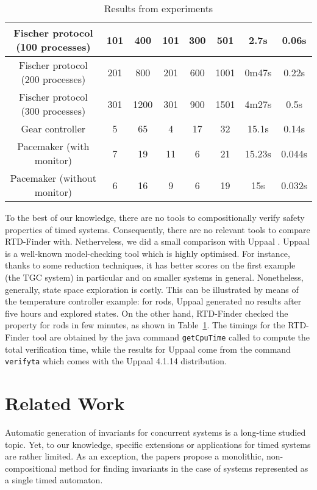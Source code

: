 \documentclass{LMCS}
\theoremstyle{plain}\newtheorem{remark}[thm]{Remark}
\theoremstyle{plain}\newtheorem{example}[thm]{Example}
\begin{document}
\begin{enumerate}
\begin{table}[htp]
{\begin{tabular}{|c|c|c|c|c|c|c|c|}
\hline \hline 
Fischer protocol (100 processes) & 101 & 400 & 101  & 300 & 501 & 2.7s & 0.06s \tabularnewline
\hline 
Fischer protocol (200 processes) & 201 & 800 & 201  & 600 & 1001 & 0m47s & 0.22s\tabularnewline
\hline 
Fischer protocol (300 processes) & 301 & 1200 &  301 & 900 & 1501 & 4m27s & 0.5s \tabularnewline
\hline \hline
Gear controller & 5 & 65 & 4 & 17 & 32 & 15.1s & 0.14s \tabularnewline
\hline \hline 
Pacemaker (with monitor) & 7 & 19 &  11 & 6 & 21 & 15.23s & 0.044s\tabularnewline
\hline 
Pacemaker (without monitor) & 6 & 16 &  9 & 6 & 19 & 15s & 0.032s\tabularnewline
\hline 
\end{tabular}
\caption{ Results from experiments} \label{tab:res}
}
\end{table}

To the best of our knowledge, there are no tools to compositionally
verify safety properties of timed systems. Consequently, there are no
relevant tools to compare RTD-Finder with. Netherveless, we did a
small comparison with Uppaal \cite{uppaal}. Uppaal is a well-known model-checking
tool which is highly optimised. For instance, thanks to some reduction
techniques, it has better scores on the first example (the TGC system)
in particular and on smaller systems in general.  Nonetheless,
generally, state space exploration is costly. This can be
illustrated by means of the temperature controller example: for
 rods, Uppaal generated no results after five hours and 
explored states. On the other hand, RTD-Finder checked the property for
 rods in few minutes, as shown in Table~\ref{tab:res}.  The
timings for the RTD-Finder tool are obtained by the java command
\texttt{getCpuTime} called to compute the total verification time,
while the results for Uppaal come from the command \texttt{verifyta}
which comes with the Uppaal 4.1.14 distribution.




\section*{Related Work} 
Automatic generation of invariants for concurrent systems is a
long-time studied topic.  Yet, to our knowledge, specific extensions
or applications for timed systems are rather limited. As an exception,
the papers \cite{badban10:inv-ta,fietzke12:inv-ta} propose a
monolithic, non-compositional method for finding invariants in the
case of systems represented as a single timed automaton.


\end{enumerate}
\end{document}
